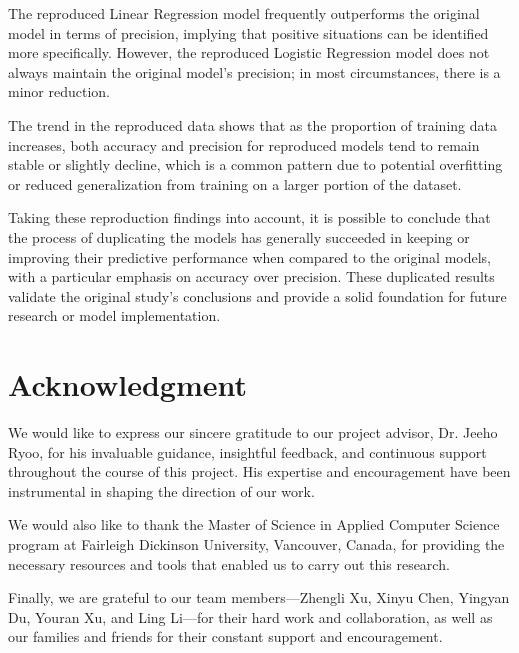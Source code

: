 \documentclass[conference]{IEEEtran}
\begin{document}
The reproduced Linear Regression model frequently outperforms the original model in terms of precision, implying that positive situations can be identified more specifically. However, the reproduced Logistic Regression model does not always maintain the original model's precision; in most circumstances, there is a minor reduction.

The trend in the reproduced data shows that as the proportion of training data increases, both accuracy and precision for reproduced models tend to remain stable or slightly decline, which is a common pattern due to potential overfitting or reduced generalization from training on a larger portion of the dataset.

Taking these reproduction findings into account, it is possible to conclude that the process of duplicating the models has generally succeeded in keeping or improving their predictive performance when compared to the original models, with a particular emphasis on accuracy over precision. These duplicated results validate the original study's conclusions and provide a solid foundation for future research or model implementation.

\section*{Acknowledgment}
We would like to express our sincere gratitude to our project advisor, Dr. Jeeho Ryoo, for his invaluable guidance, insightful feedback, and continuous support throughout the course of this project. His expertise and encouragement have been instrumental in shaping the direction of our work.

We would also like to thank the Master of Science in Applied Computer Science program at Fairleigh Dickinson University, Vancouver, Canada, for providing the necessary resources and tools that enabled us to carry out this research.

Finally, we are grateful to our team members—Zhengli Xu, Xinyu Chen, Yingyan Du, Youran Xu, and Ling Li—for their hard work and collaboration, as well as our families and friends for their constant support and encouragement.


%


\end{document}
